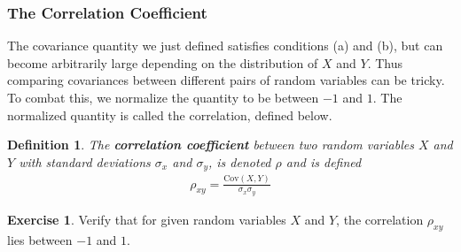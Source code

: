 \documentclass[11pt,letterpaper]{article}
\newcommand\cov{\text{Cov}}
\numberwithin{theorem}{section}
\newtheorem{definition}[theorem]{Definition}
\numberwithin{definition}{section}
\numberwithin{lemma}{section}
\numberwithin{corollary}{section}
\numberwithin{proposition}{section}
\theoremstyle{definition}
\numberwithin{remark}{section}
\numberwithin{claim}{section}
\numberwithin{observation}{section}
\numberwithin{fact}{section}
\numberwithin{assumption}{section}
\numberwithin{example}{section}
\newtheorem{exercise}[theorem]{Exercise}
\numberwithin{exercise}{section}
\begin{document}
\subsubsection{The Correlation Coefficient}
The covariance quantity we just defined satisfies conditions (a) and (b), but can become arbitrarily large depending on the distribution of $X$ and $Y$. Thus comparing covariances between different pairs of random variables can be tricky. To combat this, we normalize the quantity to be between $-1$ and $1$. The normalized quantity is called the correlation, defined below.
\begin{definition}
The \textbf{correlation coefficient} between two random variables $X$ and $Y$ with standard deviations $\sigma_x$ and $\sigma_y$, is denoted $\rho$ and is defined
\begin{align*}
\rho_{xy} = \frac{\cov(X,Y)}{\sigma_x \sigma_y}
\end{align*}
\end{definition}
\begin{exercise}
Verify that for given random variables $X$ and $Y$, the correlation $\rho_{xy}$ lies between $-1$ and $1$.
\end{exercise}
\end{document}
